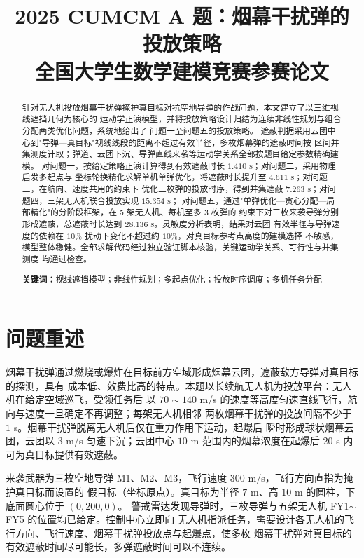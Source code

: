 \documentclass[12pt, a4paper]{article}
\title{
    \vspace{-1cm}
    {\Large \textbf{2025 CUMCM A 题：烟幕干扰弹的投放策略}} \\[0.5em]
    {\large 全国大学生数学建模竞赛参赛论文}
}
\author{}
\date{}
\begin{document}
\setcounter{page}{1}

\maketitle
\thispagestyle{plain}

\begin{abstract}
\noindent
针对无人机投放烟幕干扰弹掩护真目标对抗空地导弹的作战问题，本文建立了以三维视线遮挡几何为核心的
运动学正演模型，并将投放策略设计归结为连续非线性规划与组合分配两类优化问题，系统地给出了
问题一至问题五的投放策略。
遮蔽判据采用云团中心到"导弹—真目标"视线线段的距离不超过有效半径，多枚烟幕弹的遮蔽时间按
区间并集测度计取；弹道、云团下沉、导弹直线来袭等运动学关系全部按题目给定参数精确建模。
对问题一，按给定策略正演计算得到有效遮蔽时长 $1.410$ s；对问题二，采用物理启发多起点与
坐标轮换精化求解单机单弹优化，将遮蔽时长提升至 $4.611$ s；对问题三，在航向、速度共用的约束下
优化三枚弹的投放时序，得到并集遮蔽 $7.263$ s；对问题四，三架无人机联合投放实现 $15.354$ s；
对问题五，通过"单弹优化—贪心分配—局部精化"的分阶段框架，在 5 架无人机、每机至多 3 枚弹的
约束下对三枚来袭导弹分别形成遮蔽，总遮蔽时长达到 $28.136$ s。灵敏度分析表明，结果对云团
有效半径与导弹速度的依赖在 $10\%$ 扰动下变化不超过约 $10\%$，对真目标参考点高度的建模选择
不敏感，模型整体稳健。全部求解代码经过独立验证脚本核验，关键运动学关系、可行性与并集测度
均通过检查。

\vspace{1em}
\noindent\textbf{关键词：}视线遮挡模型；非线性规划；多起点优化；投放时序调度；多机任务分配
\end{abstract}

\newpage

\section{问题重述}

烟幕干扰弹通过燃烧或爆炸在目标前方空域形成烟幕云团，遮蔽敌方导弹对真目标的探测，具有
成本低、效费比高的特点。本题以长续航无人机为投放平台：无人机在给定空域巡飞，受领任务后
以 $70\sim 140$ m/s 的速度等高度匀速直线飞行，航向与速度一旦确定不再调整；每架无人机相邻
两枚烟幕干扰弹的投放间隔不少于 $1$ s。烟幕干扰弹脱离无人机后仅在重力作用下运动，起爆后
瞬时形成球状烟幕云团，云团以 $3$ m/s 匀速下沉；云团中心 $10$ m 范围内的烟幕浓度在起爆后
$20$ s 内可为真目标提供有效遮蔽。

来袭武器为三枚空地导弹 M1、M2、M3，飞行速度 $300$ m/s，飞行方向直指为掩护真目标而设置的
假目标（坐标原点）。真目标为半径 $7$ m、高 $10$ m 的圆柱，下底面圆心位于 $(0,200,0)$。
警戒雷达发现导弹时，三枚导弹与五架无人机 FY1$\sim$FY5 的位置均已给定。控制中心立即向
无人机指派任务，需要设计各无人机的飞行方向、飞行速度、烟幕干扰弹投放点与起爆点，使多枚
烟幕干扰弹对真目标的有效遮蔽时间尽可能长，多弹遮蔽时间可以不连续。
\end{document}
